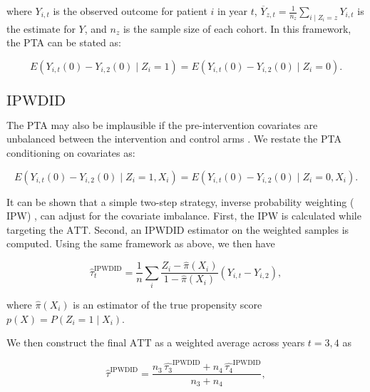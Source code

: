\documentclass[twoside,11pt]{article}
\newcommand*{\IPW}{\ensuremath{\text{IPW}}\xspace}
\newcommand*{\IPWDID}{\ensuremath{\text{IPWDID}}\xspace}
\newcommand*{\ATT}{\ensuremath{\text{ATT}}\xspace}
\newcommand*{\ATTestIPWDID}{\ensuremath{\hat{\tau}^{\IPWDID}}\xspace}
\begin{document}
\noindent where
$Y_{i,t}$ is the observed outcome for patient $i$ in year $t$,
$\overline{Y}_{z,t} = \frac{1}{n_{z}} \sum_{i \mid Z_{i}=z} Y_{i,t}$ is the estimate for $Y$,
and $n_{z}$ is the sample size of each cohort.
In this framework, the PTA can be stated as:

\begin{equation}\label{eq:DID_PTA}
E\left(Y_{i,t}(0) - Y_{i,2}(0) \mid Z_{i}=1\right) = E\left(Y_{i,t}(0) - Y_{i,2}(0) \mid Z_{i}=0\right).
\end{equation}

\subsection{\IPWDID}
\label{method:IPWDID}

The PTA may also be implausible if the pre-intervention covariates
are unbalanced between the intervention and control arms \cite{10.1111/0034-6527.00321}.
We restate the PTA conditioning on covariates as:

\begin{equation}\label{eq:DID_PTA_COND}
E\left(Y_{i,t}(0) - Y_{i,2}(0) \mid Z_{i}=1, X_{i}\right) = E\left(Y_{i,t}(0) - Y_{i,2}(0) \mid Z_{i}=0, X_{i}\right).
\end{equation}

It can be shown that a simple two-step strategy,
inverse probability weighting (\IPW) \cite{SANTANNA2020101},
can adjust for the covariate imbalance.
First, the \IPW is calculated while targeting the \ATT.
Second, an \IPWDID estimator on the weighted samples is computed.
Using the same framework as above, we then have

\begin{equation}\label{eq:IPWDID_ATT_t}
\hat{\tau}_{t}^{\IPWDID} = \frac{1}{n} \sum_{i} \frac{Z_{i} - \hat{\pi}\left(X_{i}\right)}{1 - \hat{\pi}\left(X_{i}\right)} \left(Y_{i,t} - Y_{i,2}\right),
\end{equation}

\noindent where $\hat{\pi}(X_{i})$ is an estimator of the true propensity score $p(X) = P\left(Z_{i}=1 \mid X_{i}\right)$.

We then construct the final \ATT as a weighted average across years $t=3,4$ as

\begin{equation}\label{eq:IPWDID_ATT}
\ATTestIPWDID = \frac{n_{3} \, \hat{\tau_{3}}^{\IPWDID} + n_{4} \, \hat{\tau_{4}}^{\IPWDID} }{n_{3}+n_{4}},
\end{equation}
\end{document}
